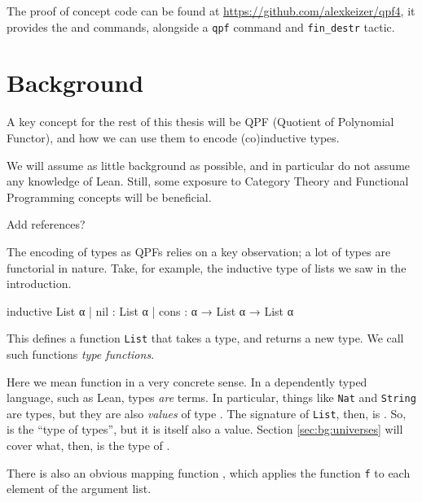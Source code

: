 \documentclass[titlepage]{report}
\newenvironment{remark}[1][Remark:]{\begin{trivlist}                         
    \item[\hskip \labelsep {\bfseries #1}]}{\end{trivlist}}
\newenvironment{todo}[1][Todo:]{\begin{trivlist}                         
    \item[\hskip \labelsep {\bfseries #1}]}{\end{trivlist}}
\newcommand\data{\lean{data}}
\newcommand\codata{\lean{codata}}
\newcommand\Type{\lean{Type}}
\begin{document}
The proof of concept code can be found at \url{https://github.com/alexkeizer/qpf4}, it provides the \data and \codata commands, alongside a \texttt{qpf} command and \texttt{fin\_destr} tactic.











\chapter{Background}
\label{ch:background}

A key concept for the rest of this thesis will be QPF (Quotient of Polynomial Functor), and how we can use them to encode (co)inductive types.

We will assume as little background as possible, and in particular do not assume any knowledge of Lean. Still, some exposure to Category Theory and Functional Programming concepts will be beneficial.
\begin{todo}
    Add references?
\end{todo}


The encoding of types as QPFs relies on a key observation; a lot of types are functorial in nature.
Take, for example, the inductive type of lists we saw in the introduction.
\begin{leancode}
    inductive List α 
    | nil  : List α
    | cons : α → List α → List α
\end{leancode}

This defines a function \texttt{List} that takes a type, and returns a new type.
We call such functions \emph{type functions}.

\begin{remark}
    Here we mean function in a very concrete sense. In a dependently typed language, such as Lean, types \emph{are} terms. In particular, things like \texttt{Nat} and \texttt{String} are types, but they are also \emph{values} of type \Type.
    The signature of \texttt{List}, then, is .
    So, \Type is the ``type of types'', but it is itself also a value.
    Section \ref{sec:bg:universes} will cover what, then, is the type of \Type.
\end{remark}

There is also an obvious mapping function , 
which applies the function \texttt{f} to each element of the argument list.
\end{document}
